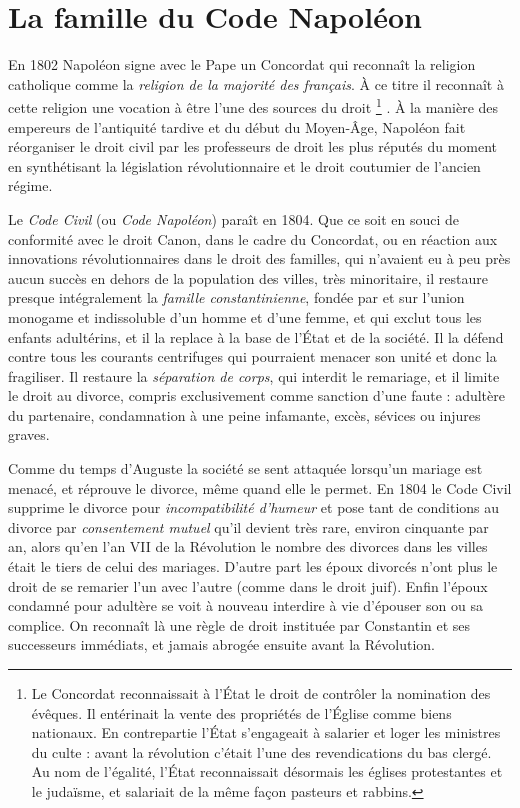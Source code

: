 
\chapter{La famille du Code Napoléon}


 En 1802 Napoléon signe avec le Pape un Concordat qui reconnaît la religion catholique comme la \emph{religion de la majorité des français}. À ce titre il reconnaît à cette religion une vocation à être l'une des sources du droit%
\footnote{Le Concordat reconnaissait à l'État le droit de contrôler la nomination des évêques. Il entérinait la vente des propriétés de l'Église comme biens nationaux. En contrepartie l'État s'engageait à salarier et loger les ministres du culte : avant la révolution c'était l'une des revendications du bas clergé. Au nom de l'égalité, l'État reconnaissait désormais les églises protestantes et le judaïsme, et salariait de la même façon pasteurs et rabbins.}%
. À la manière des empereurs de l'antiquité tardive et du début du Moyen-Âge, Napoléon fait réorganiser le droit civil par les professeurs de droit les plus réputés du moment en synthétisant la législation révolutionnaire et le droit coutumier de l'ancien régime. 

 Le \emph{Code Civil} (ou \emph{Code Napoléon}) paraît en 1804. Que ce soit en souci de conformité avec le droit Canon, dans le cadre du Concordat, ou en réaction aux innovations révolutionnaires dans le droit des familles, qui n'avaient eu à peu près aucun succès en dehors de la population des villes, très minoritaire, il restaure presque intégralement la \emph{famille constantinienne}, fondée par et sur l'union monogame et indissoluble d'un homme et d'une femme, et qui exclut tous les enfants adultérins, et il la replace à la base de l'État et de la société. Il la défend contre tous les courants centrifuges qui pourraient menacer son unité et donc la fragiliser. Il restaure la \emph{séparation de corps}, qui interdit le remariage, et il limite le droit au divorce, compris exclusivement comme sanction d'une faute : adultère du partenaire, condamnation à une peine infamante, excès, sévices ou injures graves. 

 Comme du temps d'Auguste la société se sent attaquée lorsqu'un mariage est menacé, et réprouve le divorce, même quand elle le permet. En 1804 le Code Civil supprime le divorce pour \emph{incompatibilité d'humeur} et pose tant de conditions au divorce par \emph{consentement mutuel} qu'il devient très rare, environ cinquante par an, alors qu'en l'an VII de la Révolution le nombre des divorces dans les villes était le tiers de celui des mariages. D'autre part les époux divorcés n'ont plus le droit de se remarier l'un avec l'autre (comme dans le droit juif). Enfin l'époux condamné pour adultère se voit à nouveau interdire à vie d'épouser son ou sa complice. On reconnaît là une règle de droit instituée par Constantin et ses successeurs immédiats, et jamais abrogée ensuite avant la Révolution.

